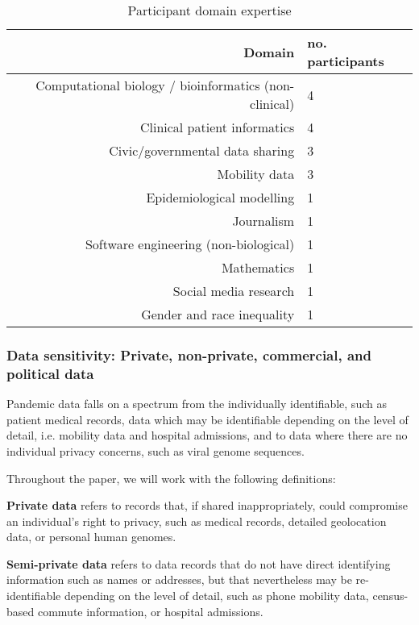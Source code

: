 \documentclass{CUP-JNL-DAP}%
\begin{document}
\begin{table}[h!]
  \begin{center}
    \caption{Participant domain expertise}
    \label{tab:professions}
    \begin{tabular}{r|l} %
      \textbf{Domain} & \textbf{no. participants} \\
      \hline
      Computational biology / bioinformatics (non-clinical)  & 4\\
      Clinical patient informatics & 4\\
      Civic/governmental data sharing & 3 \\
      Mobility data & 3\\
      Epidemiological modelling & 1\\
      Journalism & 1\\
      Software engineering (non-biological) & 1\\
      Mathematics & 1\\      
      Social media research & 1\\      
      Gender and race inequality & 1\\      
    \end{tabular}
  \end{center}
\end{table}

\subsubsection{Data sensitivity: Private, non-private, commercial, and political data}

Pandemic data falls on a spectrum from the individually identifiable, such as patient medical records, data which may be identifiable depending on the level of detail, i.e. mobility data and hospital admissions, and to data where there are no individual privacy concerns, such as viral genome sequences.  

Throughout the paper, we will work with the following definitions: 

\textbf{Private data} refers to records that, if shared inappropriately, could compromise an individual's right to privacy, such as medical records, detailed geolocation data, or personal human genomes. 

\textbf{Semi-private data} refers to data records that do not have direct identifying information such as names or addresses, but that nevertheless may be re-identifiable depending on the level of detail, such as phone mobility data, census-based commute information, or hospital admissions.
\end{document}
